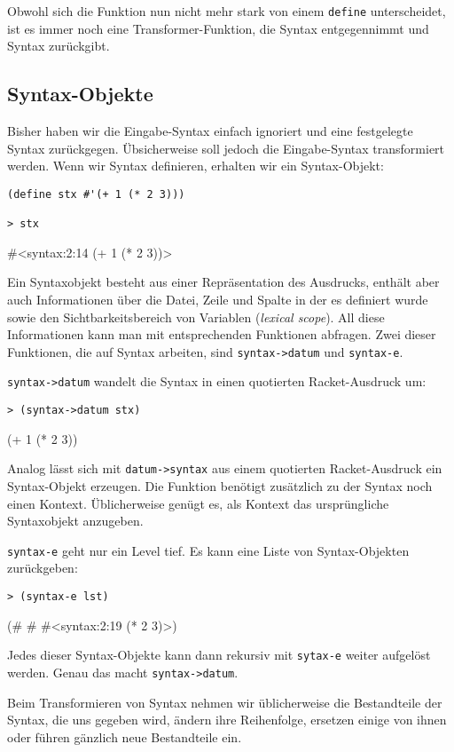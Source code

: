 Obwohl sich die Funktion nun nicht mehr stark von einem \texttt{define} unterscheidet, ist es immer noch eine Transformer-Funktion, die Syntax entgegennimmt und Syntax zurückgibt.

\subsection{Syntax-Objekte}
Bisher haben wir die Eingabe-Syntax einfach ignoriert und eine festgelegte Syntax zurückgegen. Übsicherweise soll jedoch die Eingabe-Syntax transformiert werden. Wenn wir Syntax definieren, erhalten wir ein Syntax-Objekt:

\begin{lstlisting}
(define stx #'(+ 1 (* 2 3)))

> stx
\end{lstlisting}
{\routput\#<syntax:2:14 (+ 1 (* 2 3))>}

Ein Syntaxobjekt besteht aus einer Repräsentation des Ausdrucks, enthält aber auch Informationen über die Datei, Zeile und Spalte in der es definiert wurde sowie den Sichtbarkeitsbereich von Variablen (\emph{lexical scope}). All diese Informationen kann man mit entsprechenden Funktionen abfragen. Zwei dieser Funktionen, die auf Syntax arbeiten, sind \texttt{syntax->datum} und \texttt{syntax-e}. 

\texttt{syntax->datum} wandelt die Syntax in einen quotierten Racket-Ausdruck um:

\begin{lstlisting}
> (syntax->datum stx)
\end{lstlisting}
{\rsymbol (+ 1 (* 2 3))}

Analog lässt sich mit \texttt{datum->syntax} aus einem quotierten Racket-Ausdruck ein Syntax-Objekt erzeugen. Die Funktion benötigt zusätzlich zu der Syntax noch einen Kontext. Üblicherweise genügt es, als Kontext das ursprüngliche Syntaxobjekt anzugeben.

\texttt{syntax-e} geht nur ein Level tief. Es kann eine Liste von Syntax-Objekten zurückgeben:

\begin{lstlisting}
> (syntax-e lst)
\end{lstlisting}
{\rsymbol (\#<syntax:2:15 +> \#<syntax:2:17 1> \#<syntax:2:19 (* 2 3)>)}

Jedes dieser Syntax-Objekte kann dann rekursiv mit \texttt{sytax-e} weiter aufgelöst werden. Genau das macht \texttt{syntax->datum}.

Beim Transformieren von Syntax nehmen wir üblicherweise die Bestandteile der Syntax, die uns gegeben wird, ändern ihre Reihenfolge, ersetzen einige von ihnen oder führen gänzlich neue Bestandteile ein.

